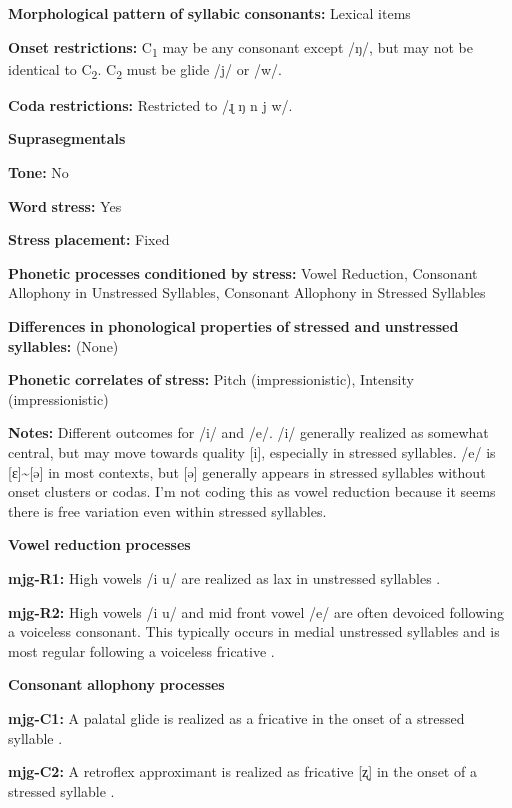 \textbf{Morphological} \textbf{pattern} \textbf{of} \textbf{syllabic} \textbf{consonants:} Lexical items

\textbf{Onset} \textbf{restrictions:} C\textsubscript{1} may be any consonant except /ŋ/, but may not be identical to C\textsubscript{2}. C\textsubscript{2} must be glide /j/ or /w/. 

\textbf{Coda} \textbf{restrictions:} Restricted to /ɻ ŋ n j w/.

\textbf{Suprasegmentals}

\textbf{Tone:} No

\textbf{Word} \textbf{stress:} Yes

\textbf{Stress} \textbf{placement:} Fixed

\textbf{Phonetic} \textbf{processes} \textbf{conditioned} \textbf{by} \textbf{stress:} Vowel Reduction, Consonant Allophony in Unstressed Syllables, Consonant Allophony in Stressed Syllables

\textbf{Differences} \textbf{in} \textbf{phonological} \textbf{properties} \textbf{of} \textbf{stressed} \textbf{and} \textbf{unstressed} \textbf{syllables:} (None)

\textbf{Phonetic} \textbf{correlates} \textbf{of} \textbf{stress:} Pitch (impressionistic), Intensity (impressionistic)

\textbf{Notes:} Different outcomes for /i/ and /e/. /i/ generally realized as somewhat central, but may move towards quality [i], especially in stressed syllables. /e/ is [ɛ]{\textasciitilde}[ə] in most contexts, but [ə] generally appears in stressed syllables without onset clusters or codas. I’m not coding this as vowel reduction because it seems there is free variation even within stressed syllables.

\textbf{Vowel} \textbf{reduction} \textbf{processes}

\textbf{mjg-R1:} High vowels /i u/ are realized as lax in unstressed syllables \citep[35]{Slater2003}.

\textbf{mjg-R2:} High vowels /i u/ and mid front vowel /e/ are often devoiced following a voiceless consonant. This typically occurs in medial unstressed syllables and is most regular following a voiceless fricative \citep[36]{Slater2003}.

\textbf{Consonant} \textbf{allophony} \textbf{processes}

\textbf{mjg-C1:} A palatal glide is realized as a fricative in the onset of a stressed syllable \citep[31-2]{Slater2003}.

\textbf{mjg-C2:} A retroflex approximant is realized as fricative [ʐ] in the onset of a stressed syllable \citep[30]{Slater2003}.

